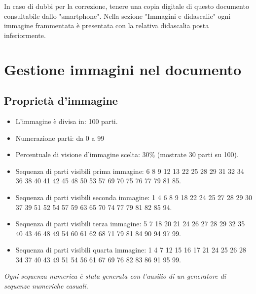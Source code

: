 \documentclass[hidelinks,12pt,a4paper]{article}
\begin{document}
	
	\vspace*{\fill}
	\centering
	\fboxrule=2pt
	\fbox
	{
		\begin{minipage}{\linewidth}
			In caso di dubbi per la correzione, tenere una copia digitale di questo documento consultabile dallo "smartphone". Nella sezione "Immagini e didascalie" ogni immagine frammentata è presentata con la relativa didascalia posta inferiormente.
		\end{minipage}
	}

	\newpage
	\section{Gestione immagini nel documento}
	
	\newline
	
	\subsection{Proprietà d'immagine}
	\begin{itemize}
		\item L'immagine è divisa in: 100 parti.
		\item Numerazione parti: da 0 a 99
		\item Percentuale di visione d'immagine scelta: 30\% (mostrate 30 parti su 100).
		\item Sequenza di parti visibili prima immagine:  6 8 9 12 13 22 25 28 29 31 32 34 36 38 40 41 42 45 48 50 53 57 69 70 75 76 77 79 81 85.
		\item Sequenza di parti visibili seconda immagine:  1 4 6 8 9 18 22 24 25 27 28 29 30 37 39 51 52 54 57 59 63 65 70 74 77 79 81 82 85 94.
		\item Sequenza di parti visibili terza immagine:  5 7 18 20 21 24 26 27 28 29 32 35 40 43 46 48 49 54 60 61 62 68 71 79 81 84 90 94 97 99.
		\item Sequenza di parti visibili quarta immagine:  1 4 7 12 15 16 17 21 24 25 26 28 34 37 40 43 49 51 54 56 61 67 69 76 82 83 86 91 95 99.
	\end{itemize}
	\textit{Ogni sequenza numerica è stata generata con l'ausilio di un generatore di sequenze numeriche casuali.}
\end{document}
